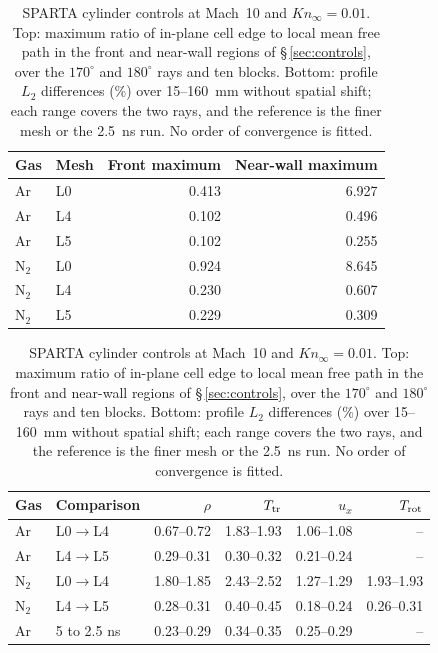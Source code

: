 \begin{table}
\centering\small
\begin{tabular}{llrr}\toprule
Gas & Mesh & Front maximum & Near-wall maximum\\\midrule
Ar&L0&0.413&6.927\\
Ar&L4&0.102&0.496\\
Ar&L5&0.102&0.255\\
N$_2$&L0&0.924&8.645\\
N$_2$&L4&0.230&0.607\\
N$_2$&L5&0.229&0.309\\
\bottomrule\end{tabular}
\par\medskip
\begin{tabular}{llrrrr}\toprule
Gas & Comparison & $\rho$ & $T_{\rm tr}$ & $u_x$ & $T_{\rm rot}$\\\midrule
Ar&L0$\to$L4&0.67--0.72&1.83--1.93&1.06--1.08&--\\
Ar&L4$\to$L5&0.29--0.31&0.30--0.32&0.21--0.24&--\\
N$_2$&L0$\to$L4&1.80--1.85&2.43--2.52&1.27--1.29&1.93--1.93\\
N$_2$&L4$\to$L5&0.28--0.31&0.40--0.45&0.18--0.24&0.26--0.31\\
Ar&5 to 2.5 ns&0.23--0.29&0.34--0.35&0.25--0.29&--\\
\bottomrule\end{tabular}
\caption{SPARTA cylinder controls at Mach~10 and $Kn_\infty=0.01$. Top: maximum ratio of in-plane cell edge to local mean free path in the front and near-wall regions of \S\,\ref{sec:controls}, over the $170^\circ$ and $180^\circ$ rays and ten blocks. Bottom: profile $L_2$ differences (\%) over 15--160~mm without spatial shift; each range covers the two rays, and the reference is the finer mesh or the 2.5~ns run. No order of convergence is fitted.}\label{tab:verification}
\end{table}
